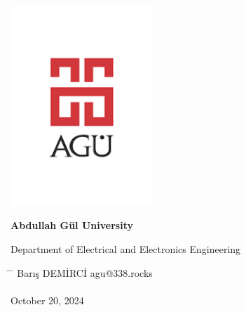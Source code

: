 \begin{center}
	\includegraphics[width=0.4\textwidth]{assets/agu.png}

	\Huge
	\textbf{Abdullah Gül University}
	
	\vspace{0.3cm}
	Department of Electrical and Electronics Engineering

	\vspace{1cm}
	\Huge
	\textbf{\paperTitle}

	\vspace{0.3cm}
	\Huge
	\paperSubTitle{}

	\vspace{0.8cm}
	\large
	\vspace{0.5cm}
	\LARGE
	\vspace{1.5cm}
	\textbf{}
	\vfill
	\vspace{0.8cm}
	\Large
\end{center}

\begin{tabbing}
	\hspace*{1em}\= \hspace*{8em} \= \kill
	\> Barış DEMİRCİ \> agu@338.rocks \\
	\> \> \\
	\> October 20, 2024 \> \\
\end{tabbing}
